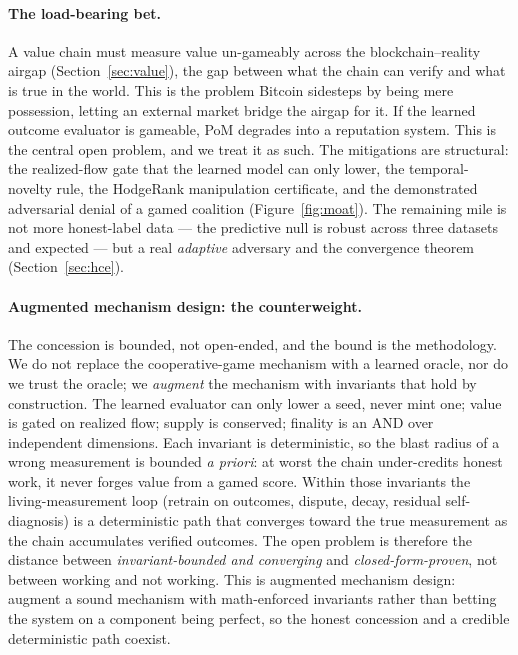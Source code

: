 \documentclass[10pt]{article}
\begin{document}
\paragraph{The load-bearing bet.} A value chain must measure value un-gameably across the
blockchain--reality airgap (Section~\ref{sec:value}), the gap between what the chain can verify and what
is true in the world. This is the problem Bitcoin sidesteps by being mere possession, letting an
external market bridge the airgap for it. If the learned outcome evaluator is gameable, PoM degrades into a
reputation system. This is the central open problem, and we treat it as such. The mitigations are
structural: the realized-flow gate that the learned model can only lower, the temporal-novelty rule,
the HodgeRank manipulation certificate, and the demonstrated adversarial denial of a gamed coalition
(Figure~\ref{fig:moat}). The remaining mile is not more honest-label data --- the predictive null is
robust across three datasets and expected --- but a real \emph{adaptive} adversary and the convergence
theorem (Section~\ref{sec:hce}).

\paragraph{Augmented mechanism design: the counterweight.} The concession is bounded, not open-ended,
and the bound is the methodology. We do not replace the cooperative-game mechanism with a learned
oracle, nor do we trust the oracle; we \emph{augment} the mechanism with invariants that hold by
construction. The learned evaluator can only lower a seed, never mint one; value is gated on realized
flow; supply is conserved; finality is an AND over independent dimensions. Each invariant is
deterministic, so the blast radius of a wrong measurement is bounded \emph{a priori}: at worst the chain
under-credits honest work, it never forges value from a gamed score. Within those invariants the
living-measurement loop (retrain on outcomes, dispute, decay, residual self-diagnosis) is a
deterministic path that converges toward the true measurement as the chain accumulates verified
outcomes. The open problem is therefore the distance between \emph{invariant-bounded and converging} and
\emph{closed-form-proven}, not between working and not working. This is augmented mechanism design:
augment a sound mechanism with math-enforced invariants rather than betting the system on a component
being perfect, so the honest concession and a credible deterministic path coexist.
\end{document}

